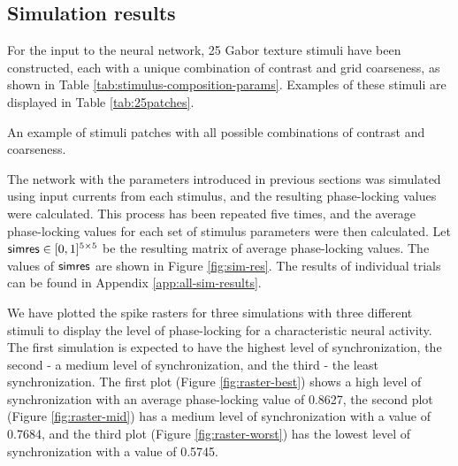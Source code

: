\subsection{Simulation results}

For the input to the neural network, 25 Gabor texture stimuli have been constructed, each with a unique combination of contrast and grid coarseness, as shown in Table \ref{tab:stimulus-composition-params}. Examples of these stimuli are displayed in Table \ref{tab:25patches}.
\begin{table}[!hpt]
    \centering
    
    \caption[All stimuli examples]{An example of stimuli patches with all possible combinations of contrast and coarseness.}
    \label{tab:25patches}
\end{table}

The network with the parameters introduced in previous sections was simulated using input currents from each stimulus, and the resulting phase-locking values were calculated. This process has been repeated five times, and the average phase-locking values for each set of stimulus parameters were then calculated. Let $\mathsf{simres} \in [0, 1]^{5 \times 5}$ be the resulting matrix of average phase-locking values.
The values of $\mathsf{simres}$ are shown in Figure \ref{fig:sim-res}. The results of individual trials can be found in Appendix \ref{app:all-sim-results}.

We have plotted the spike rasters for three simulations with three different stimuli to display the level of phase-locking for a characteristic neural activity. The first simulation is expected to have the highest level of synchronization, the second - a medium level of synchronization, and the third - the least synchronization. The first plot (Figure \ref{fig:raster-best}) shows a high level of synchronization with an average phase-locking value of 0.8627, the second plot (Figure \ref{fig:raster-mid}) has a medium level of synchronization with a value of 0.7684, and the third plot (Figure \ref{fig:raster-worst}) has the lowest level of synchronization with a value of 0.5745.

